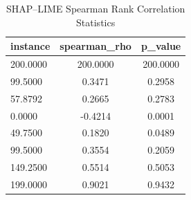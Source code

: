 \begin{table}
\centering
\caption{SHAP–LIME Spearman Rank Correlation Statistics}
\label{tab:agreement}
\begin{tabular}{lcc}
\toprule
instance & spearman_rho & p_value \\
\midrule
200.0000 & 200.0000 & 200.0000 \\
99.5000 & 0.3471 & 0.2958 \\
57.8792 & 0.2665 & 0.2783 \\
0.0000 & -0.4214 & 0.0001 \\
49.7500 & 0.1820 & 0.0489 \\
99.5000 & 0.3554 & 0.2059 \\
149.2500 & 0.5514 & 0.5053 \\
199.0000 & 0.9021 & 0.9432 \\
\bottomrule
\end{tabular}
\end{table}

